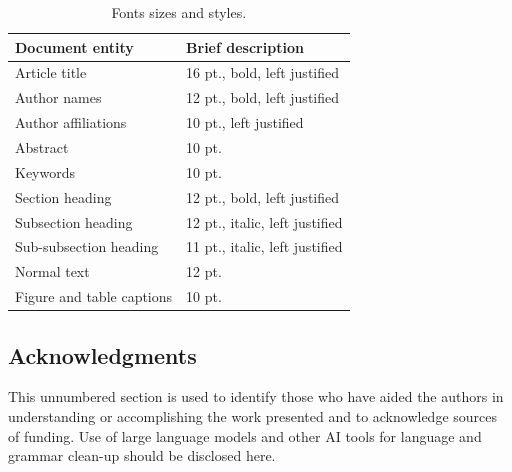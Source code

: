 \documentclass[12pt]{spieman}  %
\begin{document}
\begin{spacing}{2}
\begin{table}[ht]
\caption{Fonts sizes and styles.} 
\label{tab:fonts}
\begin{center}       
\begin{tabular}{|l|l|} %
\hline
\rule[-1ex]{0pt}{3.5ex}  Document entity & Brief description  \\
\hline\hline
\rule[-1ex]{0pt}{3.5ex}  Article title & 16 pt., bold, left justified  \\
\hline
\rule[-1ex]{0pt}{3.5ex}  Author names & 12 pt., bold, left justified   \\
\hline
\rule[-1ex]{0pt}{3.5ex}  Author affiliations & 10 pt., left justified   \\
\hline
\rule[-1ex]{0pt}{3.5ex}  Abstract & 10 pt.  \\
\hline
\rule[-1ex]{0pt}{3.5ex}  Keywords & 10 pt.  \\
\hline
\rule[-1ex]{0pt}{3.5ex}  Section heading & 12 pt., bold, left justified  \\
\hline
\rule[-1ex]{0pt}{3.5ex}  Subsection heading & 12 pt., italic, left justified  \\
\hline
\rule[-1ex]{0pt}{3.5ex}  Sub-subsection heading & 11 pt., italic, left justified  \\
\hline
\rule[-1ex]{0pt}{3.5ex}  Normal text & 12 pt. \\
\hline
\rule[-1ex]{0pt}{3.5ex}  Figure and table captions &  10 pt. \\
\hline 
\end{tabular}
\end{center}
\end{table} 

\subsection* {Acknowledgments}
This unnumbered section is used to identify those who have aided the authors in understanding or accomplishing the work presented and to acknowledge sources of funding. Use of large language models and other AI tools for language and grammar clean-up should be disclosed here. 






\end{spacing}
\end{document}
